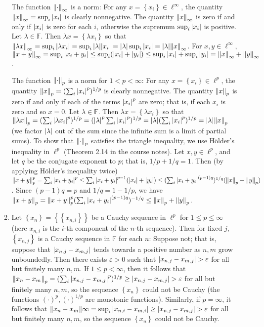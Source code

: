 \documentclass[11pt,leqno]{article}
\theoremstyle{plain}
\theoremstyle{definition}
\numberwithin{equation}{section}
\numberwithin{lem}{section}
\newcommand{\cbr}[1]{\left\{#1\right\}}
\begin{document}
\begin{enumerate}
\begin{enumerate}
    The function $\norm{\cdot}_\infty$ is a norm: For any $x = \cbr{x_i}\in \ell^\infty$, the quantity $\norm{x}_\infty = \sup_i\abs{x_i}$ is clearly nonnegative. The quantity $\norm{x}_\infty$ is zero if and only if $\abs{x_i}$ is zero for each $i$, otherwise the supremum $\sup_i\abs{x_i}$ is positive. Let $\lambda\in \mathbb F$. Then $\lambda x = \cbr{\lambda x_i}$ so that $\norm{\lambda x}_\infty = \sup_i\abs{\lambda x_i} = \sup_i \abs{\lambda}\abs{x_i} = \abs{\lambda}\sup_i\abs{x_i} = \abs{\lambda}\norm{x}_\infty$. For $x,y\in\ell^\infty$, $\norm{x+y}_\infty = \sup_i\abs{x_i+y_i}\leq \sup_i(\abs{x_i} + \abs{y_i}) \leq \sup_i\abs{x_i} + \sup_i\abs{y_i} = \norm{x}_\infty + \norm{y}_\infty$.
    
    The function $\norm{\cdot}_p$ is a norm for $1 < p < \infty$: For any $x = \cbr{x_i}\in \ell^p$, the quantity $\norm{x}_p = (\sum_i \abs{x_i}^p)^{1/p}$ is clearly nonnegative. The quantity $\norm{x}_p$ is zero if and only if each of the terms $\abs{x_i}^p$ are zero; that is, if each $x_i$ is zero and so $x = 0$. Let $\lambda\in \mathbb F$. Then $\lambda x = \cbr{\lambda x_i}$ so that $\norm{\lambda x}_p = (\sum_i \abs{\lambda x_i}^p)^{1/p} = (\abs{\lambda}^p\sum_i \abs{x_i}^p)^{1/p} = \abs{\lambda}(\sum_i \abs{x_i}^p)^{1/p} = \abs{\lambda}\norm{x}_p$ (we factor $\abs{\lambda}$ out of the sum since the infinite sum is a limit of partial sums). To show that $\norm{\cdot}_p$ satisfies the triangle inequality, we use H\"older's inequality in $\ell^p$ (Theorem 2.14 in the course notes). Let $x,y\in \ell^p$, and let $q$ be the conjugate exponent to $p$; that is, $1/p+ 1/q =1$. Then (by applying H\"older's inequality twice) $\norm{x+y}_p^p = \sum_i\abs{x_i + y_i}^p \leq \sum_i \abs{x_i + y_i}^{p-1}(\abs{x_i} + \abs{y_i}) \leq (\sum_i \abs{x_i + y_i}^{(p-1)q})^{1/q}(\norm{x}_p + \norm{y}_p)$. Since $(p-1)q = p$ and $1/q = 1-1/p$, we have $\norm{x+y}_p = \norm{x+y}_p^p (\sum_i \abs{x_i + y_i}^{(p-1)q})^{-1/q}\leq \norm{x}_p + \norm{y}_p$.
    
    \item Let $\cbr{x_n} = \cbr{\cbr{x_{n,i}}}$ be a Cauchy sequence in $\ell^p$ for $1\leq p \leq \infty$ (here $x_{n,i}$ is the $i$-th component of the $n$-th sequence). Then for fixed $j$, $\cbr{x_{n,j}}$ is a Cauchy sequence in $\mathbb F$ for each $n$: Suppose not; that is, suppose that $\abs{x_{n,j} - x_{m,j}}$ tends towards a positive number as $n,m$ grow unboundedly. Then there exists $\varepsilon>0 $ such that $\abs{x_{n,j} - x_{m,j}} > \varepsilon$ for all but finitely many $n,m$. If $1\leq p < \infty$, then it follows that $\norm{x_n - x_m}_p = (\sum_i\abs{x_{n,j} - x_{m,j}}^p)^{1/p}\geq \abs{x_{n,j} - x_{m,j}} > \varepsilon$ for all but finitely many $n,m$, so the sequence $\cbr{x_n}$ could not be Cauchy (the functions $(\cdot)^p,(\cdot)^{1/p}$ are monotonic functions). Similarly, if $p = \infty$, it follows that $\norm{x_n-x_m}\infty = \sup_i\abs{x_{n,i} - x_{m,i}}\geq \abs{x_{n,j} - x_{m,j}} > \varepsilon$ for all but finitely many $n,m$, so the sequence $\cbr{x_n}$ could not be Cauchy. 
    

\end{enumerate}
\end{enumerate}
\end{document}
